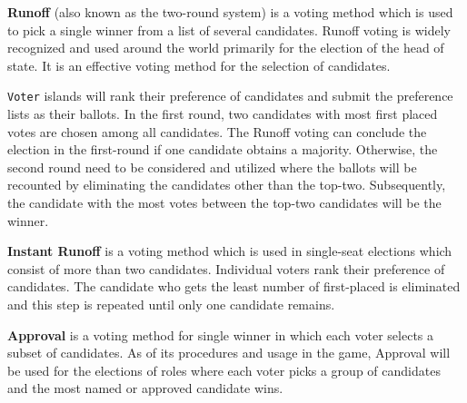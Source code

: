
\textbf{Runoff} (also known as the two-round system) is a voting method which is used to pick a single winner from a list of several candidates. 
Runoff voting is widely recognized and used around the world primarily for the election of the head of state. It is an effective voting method for the selection of candidates.

\texttt{Voter} islands will rank their preference of candidates and submit the preference lists as their ballots. In the first round, two candidates with most first placed votes are chosen among all candidates. The Runoff voting can conclude the election in the first-round if one candidate obtains a majority. Otherwise, the second round need to be considered and utilized where the ballots will be recounted by eliminating the candidates other than the top-two. Subsequently, the candidate with the most votes between the top-two candidates will be the winner.

\textbf{Instant Runoff} is a voting method which is used in single-seat elections which consist of more than two candidates. 
Individual voters rank their preference of candidates. The candidate who gets the least number of first-placed is eliminated and this step is repeated until only one candidate remains.


\textbf{Approval} is a voting method for single winner in which each voter selects a subset of candidates. As of its procedures and usage in the game, Approval will be used for the elections of roles where each voter picks a group of candidates and the most named or approved candidate wins.

